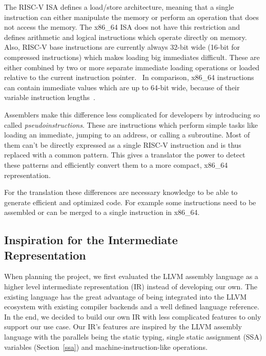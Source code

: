 \documentclass[course=eragp]{aspdoc}
\begin{document}
\par

The RISC-V ISA defines a load/store architecture, meaning that a single instruction can either
manipulate the memory or perform an operation that does not access the memory. The x86\_64 ISA
does not have this restriction and defines arithmetic and logical instructions which operate
directly on memory. Also, RISC-V base instructions are currently always
32-bit wide (16-bit for compressed instructions) which makes loading big
immediates difficult. These are either combined by two or more separate immediate loading operations
or loaded relative to the current instruction pointer.~\cite{rvspec} In comparison, x86\_64 instructions
can contain immediate values which are up to 64-bit wide, because
of their variable instruction lengths~\cite{intel2017man}.

\par

Assemblers make this difference less complicated for developers by introducing so called
\textit{pseudoinstructions}. These are instructions which perform simple tasks like loading an
immediate, jumping to an address, or calling a subroutine. Most of them can't be directly expressed
as a single RISC-V instruction and is thus replaced with a common pattern. This gives a translator
the power to detect these patterns and efficiently convert them to a more compact, x86\_64 representation.

\par

For the translation these differences are necessary knowledge to be able to generate efficient and
optimized code. For example some instructions need to be assembled or can be merged to a single
instruction in x86\_64.

\subsection{Inspiration for the Intermediate Representation}

When planning the project, we first evaluated the LLVM assembly language as a higher level
intermediate representation (IR) instead of developing our own. The existing language has the great advantage of
being integrated into the LLVM ecosystem with existing compiler backends and a well defined language reference. In
the end, we decided to build our own IR with less complicated features to only support our use case.
Our IR's features are inspired by the LLVM assembly language with the parallels being the static
typing, single static assignment (SSA) variables (Section~\ref{ssa}) and machine-instruction-like operations.
\end{document}
